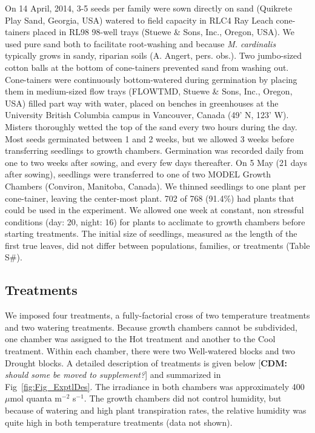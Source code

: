 \documentclass[11pt, oneside]{article}\usepackage[]{graphicx}\usepackage[]{color}
\newcommand{\cdm}[1]{{ \color{magenta} [{\bf{CDM:}} {\em#1}]}} %
\begin{document}
On 14 April, 2014, 3-5 seeds per family were sown directly on sand (Quikrete Play Sand, Georgia, USA) watered to field capacity in RLC4 Ray Leach cone-tainers placed in RL98 98-well trays (Stuewe \& Sons, Inc., Oregon, USA). We used pure sand both to facilitate root-washing and because \textit{M. cardinalis} typically grows in sandy, riparian soils (A. Angert, pers. obs.). Two jumbo-sized cotton balls at the bottom of cone-tainers prevented sand from washing out. Cone-tainers were continuously bottom-watered during germination by placing them in medium-sized flow trays (FLOWTMD, Stuewe \& Sons, Inc., Oregon, USA) filled part way with water, placed on benches in greenhouses at the University British Columbia campus in Vancouver, Canada (49' N, 123' W). Misters thoroughly wetted the top of the sand every two hours during the day. Most seeds germinated between 1 and 2 weeks, but we allowed 3 weeks before transferring seedlings to growth chambers. Germination was recorded daily from one to two weeks after sowing, and every few days thereafter. On 5 May (21 days after sowing), seedlings were transferred to one of two MODEL Growth Chambers (Conviron, Manitoba, Canada). We thinned seedlings to one plant per cone-tainer, leaving the center-most plant. 702 of 768 (91.4\%) had plants that could be used in the experiment. We allowed one week at constant, non stressful conditions (day: 20\celsius, night: 16\celsius) for plants to acclimate to growth chambers before starting treatments. The initial size of seedlings, measured as the length of the first true leaves, did not differ between populations, families, or treatments (Table S\#).
    
\subsection*{Treatments}

We imposed four treatments, a fully-factorial cross of two temperature treatments and two watering treatments. Because growth chambers cannot be subdivided, one chamber was assigned to the Hot treatment and another to the Cool treatment. Within each chamber, there were two Well-watered blocks and two Drought blocks. A detailed description of treatments is given below \cdm{should some be moved to supplement?} and summarized in Fig~\ref{fig:Fig_ExptlDes}. The irradiance in both chambers was approximately 400 $\mu$mol quanta m$^{-2}$ s$^{-1}$. The growth chambers did not control humidity, but because of watering and high plant transpiration rates, the relative humidity was quite high in both temperature treatments (data not shown). 
\end{document}
